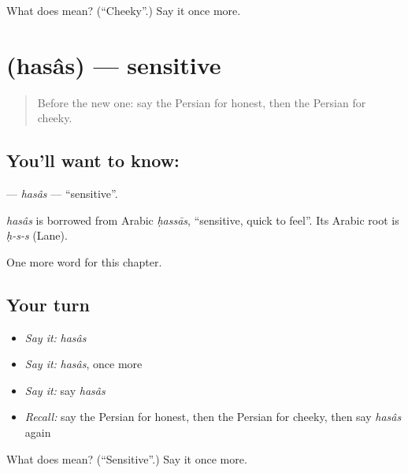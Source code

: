 \begin{tcolorbox}[breakable,colback=teal!4,colframe=teal!35!black,title={Before you move on}]
What does  mean? (\textquotedblleft{}Cheeky\textquotedblright{}.) Say it once more.
\end{tcolorbox}
\section[\texorpdfstring{\fa{حساس} (hasâs)}{حساس (hasâs)}]{ (hasâs) — sensitive}

\label{lesson:FA-C272-hasas}



\begin{quote}
Before the new one: say the Persian for honest, then the Persian for cheeky.
\end{quote}

\subsection*{You'll want to know: }
\textbf{} — \emph{hasâs} — \textquotedblleft{}sensitive\textquotedblright{}.

\begin{cousinweb}
\emph{hasâs} is borrowed from Arabic \emph{ḥassās}, \textquotedblleft{}sensitive, quick to feel\textquotedblright{}. Its Arabic root is \emph{ḥ-s-s} (Lane).
\end{cousinweb}

\begin{grammarlens}[title={What you've built}]
One more word for this chapter.
\end{grammarlens}

\subsection*{Your turn}
\begin{itemize}
\raggedright
  \item \emph{Say it:} \emph{hasâs}
  \item \emph{Say it:} \emph{hasâs}, once more
  \item \emph{Say it:} say \emph{hasâs}
  \item \emph{Recall:} say the Persian for honest, then the Persian for cheeky, then say \emph{hasâs} again
\end{itemize}

\begin{tcolorbox}[breakable,colback=teal!4,colframe=teal!35!black,title={Before you move on}]
What does  mean? (\textquotedblleft{}Sensitive\textquotedblright{}.) Say it once more.
\end{tcolorbox}
